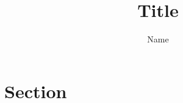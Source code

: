 \documentclass[a4paper,11pt]{article}
\author{Name}
\title{Title}
\numberwithin{equation}{section} %
\theoremstyle{definition}
\begin{document}
    \maketitle


    \section{Section}

\end{document}
